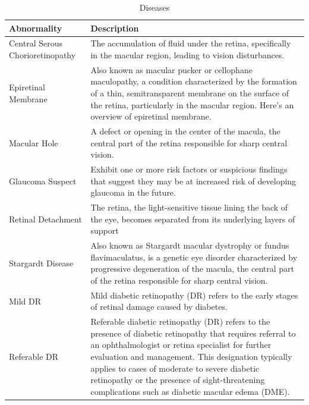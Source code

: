 \documentclass{article}
\begin{document}
		{
		\fontsize{9}{12}\selectfont
		{
			\begin{longtable}{lp{3.8in}}
				\caption{Diseases}
				\label{tb:diseases}\\
				\toprule
				Abnormality&Description\\
				\toprule
				
				\multicolumn{1}{l}{Central Serous Chorioretinopathy} & The accumulation of fluid under the retina, specifically in the macular region, leading to vision disturbances.\\
				
				\multicolumn{1}{l}{Epiretinal Membrane} & Also known as macular pucker or cellophane maculopathy, a condition characterized by the formation of a thin, semitransparent membrane on the surface of the retina, particularly in the macular region. Here's an overview of epiretinal membrane. \\
				
				\multicolumn{1}{l}{Macular Hole} & A defect or opening in the center of the macula, the central part of the retina responsible for sharp central vision. \\
				
				\multicolumn{1}{l}{Glaucoma Suspect} & Exhibit one or more risk factors or suspicious findings that suggest they may be at increased risk of developing glaucoma in the future. \\
				
				\multicolumn{1}{l}{Retinal Detachment} & The retina, the light-sensitive tissue lining the back of the eye, becomes separated from its underlying layers of support\\
				
				\multicolumn{1}{l}{Stargardt Disease} & Also known as Stargardt macular dystrophy or fundus flavimaculatus, is a genetic eye disorder characterized by progressive degeneration of the macula, the central part of the retina responsible for sharp central vision.\\
				
				\multicolumn{1}{l}{Mild DR} & Mild diabetic retinopathy (DR) refers to the early stages of retinal damage caused by diabetes. \\
				
				\multicolumn{1}{l}{Referable DR} & Referable diabetic retinopathy (DR) refers to the presence of diabetic retinopathy that requires referral to an ophthalmologist or retina specialist for further evaluation and management. This designation typically applies to cases of moderate to severe diabetic retinopathy or the presence of sight-threatening complications such as diabetic macular edema (DME). \\
				

\end{longtable}}}
\end{document}
